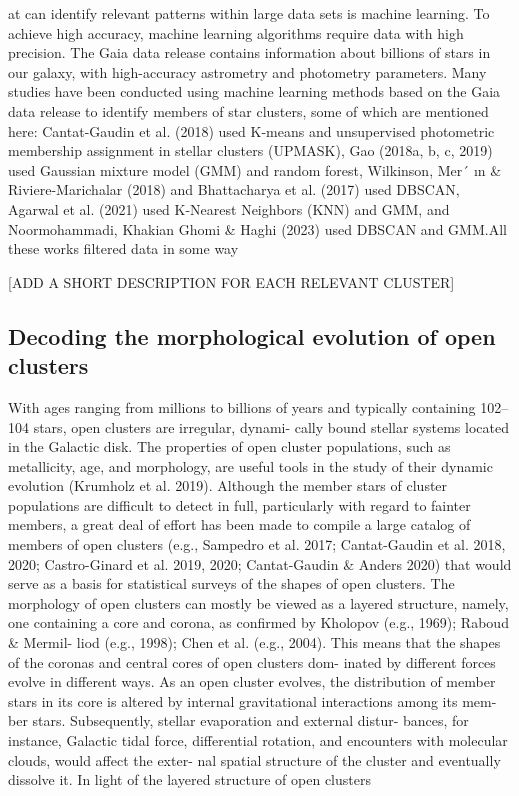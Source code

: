 \documentclass[../main.tex]{subfiles}
\begin{document}
{at can identify relevant patterns within large data sets is machine
learning. To achieve high accuracy, machine learning algorithms
require data with high precision. The Gaia data release contains
information about billions of stars in our galaxy, with high-accuracy
astrometry and photometry parameters. Many studies have been
conducted using machine learning methods based on the Gaia data
release to identify members of star clusters, some of which are
mentioned here: Cantat-Gaudin et al. (2018) used K-means and
unsupervised photometric membership assignment in stellar clusters
(UPMASK), Gao (2018a, b, c, 2019) used Gaussian mixture model
(GMM) and random forest, Wilkinson, Mer´
ın & Riviere-Marichalar
(2018) and Bhattacharya et al. (2017) used DBSCAN, Agarwal
et al. (2021) used K-Nearest Neighbors (KNN) and GMM, and
Noormohammadi, Khakian Ghomi & Haghi (2023) used DBSCAN
and GMM.All these works filtered data in some way

	[ADD A SHORT DESCRIPTION FOR EACH RELEVANT CLUSTER]
\subsection{Decoding the morphological evolution of open clusters}

With ages ranging from millions to billions of years and typically
containing 102–104 stars, open clusters are irregular, dynami-
cally bound stellar systems located in the Galactic disk. The
properties of open cluster populations, such as metallicity, age,
and morphology, are useful tools in the study of their dynamic
evolution (Krumholz et al. 2019). Although the member stars
of cluster populations are diﬃcult to detect in full, particularly
with regard to fainter members, a great deal of eﬀort has been
made to compile a large catalog of members of open clusters
(e.g., Sampedro et al. 2017; Cantat-Gaudin et al. 2018, 2020;
Castro-Ginard et al. 2019, 2020; Cantat-Gaudin & Anders 2020)
that would serve as a basis for statistical surveys of the shapes of
open clusters.
The morphology of open clusters can mostly be viewed as
a layered structure, namely, one containing a core and corona,
as confirmed by Kholopov (e.g., 1969); Raboud & Mermil-
liod (e.g., 1998); Chen et al. (e.g., 2004). This means that the
shapes of the coronas and central cores of open clusters dom-
inated by diﬀerent forces evolve in diﬀerent ways. As an open
cluster evolves, the distribution of member stars in its core is
altered by internal gravitational interactions among its mem-
ber stars. Subsequently, stellar evaporation and external distur-
bances, for instance, Galactic tidal force, diﬀerential rotation,
and encounters with molecular clouds, would aﬀect the exter-
nal spatial structure of the cluster and eventually dissolve it. In
light of the layered structure of open clusters

}
\end{document}
